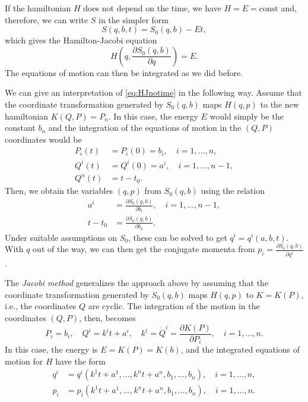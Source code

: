 \documentclass[english,fontsize=11pt,paper=b5]{scrbook}
\numberwithin{equation}{chapter}
\theoremstyle{definition}
\begin{document}
    If the hamiltonian $H$ does not depend on the time, we have $H=E=\mathrm{const}$ and, therefore, we can write $S$ in the simpler form
    \begin{equation}
      S(q,b,t) = S_0(q,b) - E t,
    \end{equation}
    which gives the Hamilton-Jacobi equation
    \begin{equation}\label{eq:HJnotime}
      H\left(q, \frac{\partial S_0(q,b)}{\partial q}\right) = E.
    \end{equation}
    The equations of motion can then be integrated as we did before.

    We can give an interpretation of \eqref{eq:HJnotime} in the following way.
    Assume that the coordinate transformation generated by $S_0(q,b)$ maps $H(q,p)$ to the new hamiltonian $K(Q,P)=P_n$.
    In this case, the energy $E$ would simply be the constant $b_n$ and the integration of the equations of motion in the $(Q,P)$ coordinates would be
    \begin{align}
      P_i(t) & = P_i(0) = b_i, \quad i=1,\ldots,n,   \\
      Q^i(t) & = Q^i(0) = a^i, \quad i=1,\ldots,n-1, \\
      Q^n(t) & = t- t_0.
    \end{align}
    Then, we obtain the variables $(q,p)$ from $S_0(q,b)$ using the relation
    \begin{align}
      a^i   & = \frac{\partial S_0(q,b)}{\partial b_i}, \quad i=1,\ldots,n-1, \\
      t-t_0 & = \frac{\partial S_0(q,b)}{\partial b_n}.
    \end{align}
    Under suitable assumptions on $S_0$, these can be solved to get $q^i = q^i(a,b,t)$. With $q$ out of the way, we can then get the conjugate momenta from $p_i = \frac{\partial S_0(q,b)}{\partial q^i}$.

    The \emph{Jacobi method} generalizes the approach above by assuming that the coordinate transformation generated by $S_0(q,b)$ maps $H(q,p)$ to $K = K(P)$, i.e., the coordinates $Q$ are cyclic.
    The integration of the motion in the coordinates $(Q,P)$, then, becomes
    \begin{equation}\label{eq:JacobiM}
      P_i = b_i, \quad
      Q^i = k^i t + a^i, \quad
      k^i = \dot Q^i = \frac{\partial K(P)}{\partial P_i}, \quad
      i = 1,\ldots,n.
    \end{equation}
    In this case, the energy is $E = K(P) = K(b)$, and the integrated equations of motion for $H$ have the form
    \begin{align}
      q^i & = q^i(k^1 t + a^1, \ldots, k^n t + a^n, b_1, \ldots, b_n), \quad i=1,\ldots,n, \\
      p_i & = p_i(k^1 t + a^1, \ldots, k^n t + a^n, b_1, \ldots, b_n), \quad i=1,\ldots,n.
    \end{align}
\end{document}
